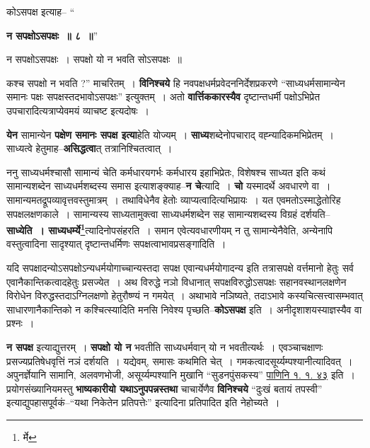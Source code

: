 \documentclass[article,12pt,a4paper]{memoir}
\begin{document}
	कोऽसपक्ष इत्याह-- “
	  
	\textbf{न सपक्षोऽसपक्षः ॥ ८ ॥}” 
	  
	न सपक्षोऽसपक्षः । सपक्षो यो न भवति सोऽसपक्षः ॥ 
	  
	कश्च सपक्षो न भवति ?” माचरितम् । \textbf{विनिश्चये} हि नवपक्षधर्मप्रवेदननिर्देशप्रकरणे “साध्यधर्मसामान्येन समानः पक्षः सपक्षस्तदभावोऽसपक्षः” इत्युक्तम् । अतो \textbf{वार्त्तिककारस्यैव} दृष्टान्तधर्मी पक्षोऽभिप्रेत उपचारादित्यत्राप्येवमयं व्याचष्ट इत्यदोषः ।
	\pend
      

	  \pstart \textbf{येन} सामान्येन \textbf{पक्षेण समानः सपक्ष इत्या}हेति योज्यम् । \textbf{साध्य}शब्देनोपचाराद् वह्न्यादिकमभिप्रेतम् । साध्यत्वे हेतुमाह--\textbf{असिद्धत्वा}त् तत्रानिश्चितत्वात् ।
	\pend
      

	  \pstart ननु साध्यधर्मश्चासौ सामान्यं चेति कर्मधारयगर्भः कर्मधारय इहाभिप्रेतः, विशेषश्च साध्यत इति कथं सामान्यशब्देन साध्यधर्मशब्दस्य समास इत्याशङ्क्याह--\textbf{न चे}त्यादि । \textbf{चो} यस्मादर्थे अवधारणे वा । सामान्यमतद्रूपव्यावृत्तवस्तुमात्रम् । तथाविधेनैव हेतोः \leavevmode{} व्याप्यत्वादित्यभिप्रायः । यत एवमतोऽस्माद्धेतोरिह सपक्षलक्षणकाले । सामान्यस्य साध्यतामुक्त्वा साध्यधर्मशब्देन सह सामान्यशब्दस्य विग्रहं दर्शयति--\textbf{साध्येति । साध्यधर्म्ये\footnote{र्मे}}त्यादिनोपसंहरति । समान एवेत्यवधारणीयम् न तु सामान्येनैवेति, अन्येनापि वस्तुत्वादिना सादृश्यात् दृष्टान्तधर्मिणः सपक्षत्वाभावप्रसङ्गादिति ।
	\pend
      

	  \pstart यदि सपक्षादन्योऽसपक्षोऽन्यधर्मयोगाच्चान्यस्तदा सपक्ष एवान्यधर्मयोगादन्य इति तत्रासपक्षे वर्त्तमानो हेतुः सर्व एवानैकान्तिकत्वादहेतुः प्रसज्येत । अथ विरुद्धे नञो विधानात् सपक्षविरुद्धोऽसपक्षः सहानवस्थानलक्षणेन विरोधेन विरुद्धस्तदाऽग्निलक्षणो हेतुरौष्ण्यं न गमयेत् । अथाभावे नञिष्यते, तदाऽभावे कस्यचित्सत्त्वासम्भवात् साधारणानैकान्तिको न कश्चित्स्यादिति मनसि निवेश्य पृच्छति--\textbf{कोऽसपक्ष} इति । अनीदृशाशयस्याज्ञस्यैव वा प्रश्नः ।
	\pend
      

	  \pstart \textbf{न सपक्ष} इत्याद्युत्तरम् । \textbf{सपक्षो यो न} भवतीति साध्यधर्मवान् यो न भवतीत्यर्थः । एवञ्चाचक्षाणः प्रसज्यप्रतिषेधवृत्तिं नञं दर्शयति । यद्येवम्, समासः कथमिति चेत् । गमकत्वादसूर्य्यम्पश्यानीत्यादिवत् । अपुनर्ज्ञेयानि सामानि, अलवणभोजी, असूर्य्यम्पश्यानि मुखानि “सुडनपुंसकस्य” \href{http://http://sarit.indology.info/?cref=Pā.1.1.43}{पाणिनि १. १. ४३} इति । प्रयोगसंख्यानियमस्तु \textbf{भाष्यकारीयो यथाऽनुपपन्नस्तथा} चाचार्येणैव \textbf{विनिश्चये} “दुःखं बतायं तपस्वी” इत्याद्युपहासपूर्वकं--“यथा निकेतेन प्रतिपत्तेः” इत्यादिना प्रतिपादित इति नेहोच्यते ।
	\pend
      \leavevmode{}
	  \bigskip
	  \begingroup
	
\end{document}
